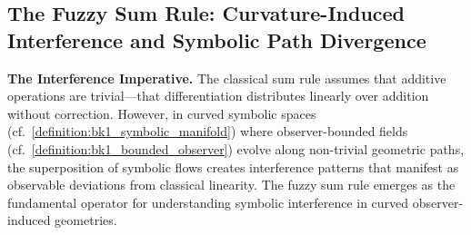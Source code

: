 \subsection{The Fuzzy Sum Rule: Curvature-Induced Interference and Symbolic Path Divergence}
\label{subsec:bk4_fuzzy_sum_rule}

\textbf{The Interference Imperative.} The classical sum rule assumes that additive operations are trivial---that differentiation distributes linearly over addition without correction. However, in curved symbolic spaces (cf.~\ref{definition:bk1_symbolic_manifold}) where observer-bounded fields (cf.~\ref{definition:bk1_bounded_observer}) evolve along non-trivial geometric paths, the superposition of symbolic flows creates interference patterns that manifest as observable deviations from classical linearity. The fuzzy sum rule emerges as the fundamental operator for understanding symbolic interference in curved observer-induced geometries.

